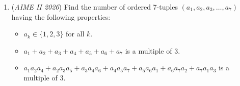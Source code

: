 \begin{enumerate}
	\item (\textit{AIME II 2026}) Find the number of ordered 7-tuples $(a_1, a_2, a_3, \ldots, a_7)$ having the following properties:


 
            \begin{itemize}
        \item $a_k \in \{1,2,3\}$ for all $k.$

        \item $a_1+a_2+a_3+a_4+a_5+a_6+a_7$ is a multiple of $3.$

        \item $a_1a_2 a_4 + a_2a_3a_5 + a_3a_4 a_6 + a_4 a_5 a_7 + a_5 a_6 a_1 + a_6 a_7 a_2 + a_7 a_1 a_3$ is a multiple of $3.$
            \end{itemize}
            

\end{enumerate}